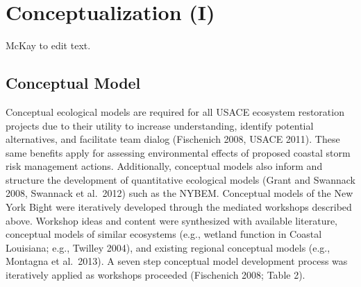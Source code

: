 \documentclass[
]{book}
\begin{document}
\hypertarget{conceptualization-i}{%
\chapter{Conceptualization (I)}\label{conceptualization-i}}

{McKay to edit text.}

\hypertarget{conceptual-model}{%
\section{Conceptual Model}\label{conceptual-model}}

Conceptual ecological models are required for all USACE ecosystem restoration projects due to their utility to increase understanding, identify potential alternatives, and facilitate team dialog (Fischenich 2008, USACE 2011). These same benefits apply for assessing environmental effects of proposed coastal storm risk management actions. Additionally, conceptual models also inform and structure the development of quantitative ecological models (Grant and Swannack 2008, Swannack et al.~2012) such as the NYBEM. Conceptual models of the New York Bight were iteratively developed through the mediated workshops described above. Workshop ideas and content were synthesized with available literature, conceptual models of similar ecosystems (e.g., wetland function in Coastal Louisiana; e.g., Twilley 2004), and existing regional conceptual models (e.g., Montagna et al.~2013). A seven step conceptual model development process was iteratively applied as workshops proceeded (Fischenich 2008; Table 2).
\end{document}
